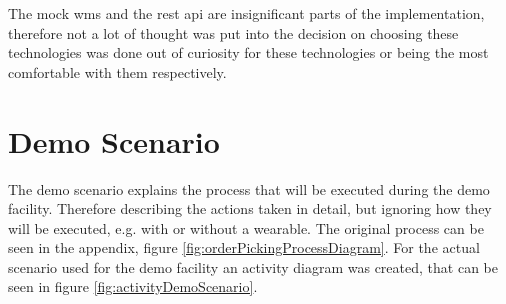 The mock \gls{wms} and the \gls{rest} \gls{api} are insignificant parts of the implementation, therefore not a lot of thought was put into the decision on choosing these technologies was done out of curiosity for these technologies or being the most comfortable with them respectively.

\section{Demo Scenario}\label{sec:demoScenario}
The demo scenario explains the process that will be executed during the demo facility. Therefore describing the actions taken in detail, but ignoring how they will be executed, e.g. with or without a wearable. The original process can be seen in the appendix, figure \ref{fig:orderPickingProcessDiagram}. For the actual scenario used for the demo facility an activity diagram was created, that can be seen in figure \ref{fig:activityDemoScenario}. 

